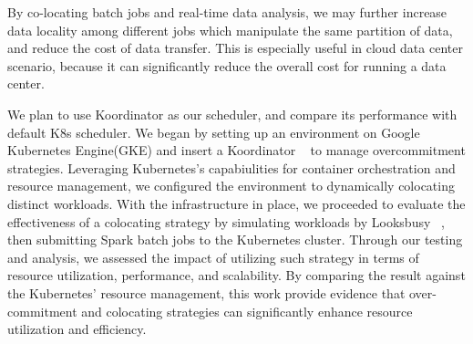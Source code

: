 By co-locating batch jobs and real-time data analysis, we may further increase data locality among different jobs which manipulate the same partition of data, and reduce the cost of data transfer. This is especially useful in cloud data center scenario, because it can significantly reduce the overall cost for running a data center.

We plan to use Koordinator \cite{koo} as our scheduler, and compare its performance with default K8s scheduler. We began by setting up an environment on Google Kubernetes Engine(GKE) and insert a Koordinator ~\cite{koo} to manage overcommitment strategies. Leveraging Kubernetes's capabiulities for container orchestration and resource management, we configured the environment to dynamically colocating distinct workloads. With the infrastructure in place, we proceeded to evaluate the effectiveness of a colocating strategy by simulating workloads by Looksbusy ~\cite{looksbusy}, then submitting Spark batch jobs to the Kubernetes cluster. Through our testing and analysis, we assessed the impact of utilizing such strategy in terms of resource utilization, performance, and scalability. By comparing the result against the Kubernetes' resource management, this work provide evidence that over-commitment and colocating strategies can significantly enhance resource utilization and efficiency.